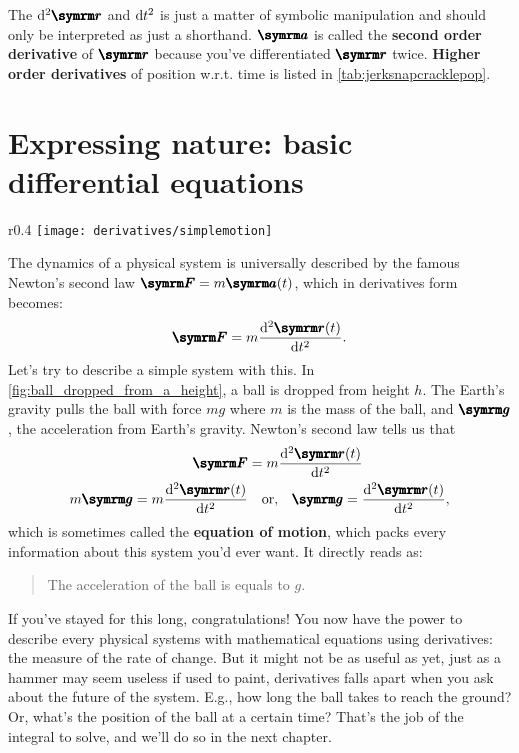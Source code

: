 The $\odif[ord = 2]{\vv{r}}$ and $\odif{t}^2$ is just a matter of symbolic manipulation and should only be interpreted as just a shorthand. $\vv{a}$ is called the \textbf{second order derivative} of $\vv{r}$ because you've differentiated $\vv{r}$ twice. \textbf{Higher order derivatives} of position w.r.t. time is listed in \cref{tab:jerksnapcracklepop}.

\section{Expressing nature: basic differential equations}
\label{sec:basicdifferentialequations}

\begin{wrapfigure}[14]{r}{0.4\textwidth}
    \centering
    \texttt{[image: derivatives/simplemotion]}
    \caption{A ball dropped from height $h$}
    \label{fig:ball_dropped_from_a_height}
\end{wrapfigure}
The dynamics of a physical system is universally described by the famous Newton's second law $\vv{F} = m\vv{a}(t)$, which in derivatives form becomes:
\begin{equation}
    \vv{F} = m\odv[ord = 2]{\vv{r}(t)}{t}. \label{eq:newton_second_law}
\end{equation}
Let's try to describe a simple system with this. In \cref{fig:ball_dropped_from_a_height}, a ball is dropped from height $h$. The Earth's gravity pulls the ball with force $mg$ where $m$ is the mass of the ball, and $\vv{g}$, the acceleration from Earth's gravity. Newton's second law tells us that
\begin{align}
    \vv{F} &= m\odv[ord = 2]{\vv{r}(t)}{t} \nonumber\\
    m\vv{g} = m\odv[ord = 2]{\vv{r}(t)}{t} &\quad \textrm{or,} \quad \vv{g} = \odv[ord = 2]{\vv{r}(t)}{t},
\end{align}
which is sometimes called the \textbf{equation of motion}, which packs every information about this system you'd ever want. It directly reads as:
\begin{quotation}
    The acceleration of the ball is equals to $g$.
\end{quotation}
If you've stayed for this long, congratulations! You now have the power to describe every physical systems with mathematical equations using derivatives: the measure of the rate of change. But it might not be as useful as yet, just as a hammer may seem useless if used to paint, derivatives falls apart when you ask about the future of the system. E.g., how long the ball takes to reach the ground? Or, what's the position of the ball at a certain time? That's the job of the integral to solve, and we'll do so in the next chapter.

